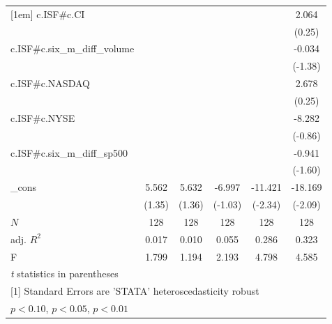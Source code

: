 \begin{table}[htbp]
\begin{tabular}{l*{5}{c}}
[1em]
c.ISF#c.CI  &                     &                     &                     &                     &       2.064         \\
            &                     &                     &                     &                     &      (0.25)         \\
[1em]
c.ISF#c.six\_m\_diff\_volume&                     &                     &                     &                     &      -0.034         \\
            &                     &                     &                     &                     &     (-1.38)         \\
[1em]
c.ISF#c.NASDAQ&                     &                     &                     &                     &       2.678         \\
            &                     &                     &                     &                     &      (0.25)         \\
[1em]
c.ISF#c.NYSE&                     &                     &                     &                     &      -8.282         \\
            &                     &                     &                     &                     &     (-0.86)         \\
[1em]
c.ISF#c.six\_m\_diff\_sp500&                     &                     &                     &                     &      -0.941         \\
            &                     &                     &                     &                     &     (-1.60)         \\
[1em]
\_cons      &       5.562         &       5.632         &      -6.997         &     -11.421\sym{**} &     -18.169\sym{**} \\
            &      (1.35)         &      (1.36)         &     (-1.03)         &     (-2.34)         &     (-2.09)         \\
\hline
\(N\)       &         128         &         128         &         128         &         128         &         128         \\
adj. \(R^{2}\)&       0.017         &       0.010         &       0.055         &       0.286         &       0.323         \\
F           &       1.799         &       1.194         &       2.193         &       4.798         &       4.585         \\
\hline\hline
\multicolumn{6}{l}{\footnotesize \textit{t} statistics in parentheses}\\
\multicolumn{6}{l}{\footnotesize [1] Standard Errors are 'STATA' heteroscedasticity robust}\\
\multicolumn{6}{l}{\footnotesize \sym{*} \(p<0.10\), \sym{**} \(p<0.05\), \sym{***} \(p<0.01\)}\\
\end{tabular}
\end{table}
